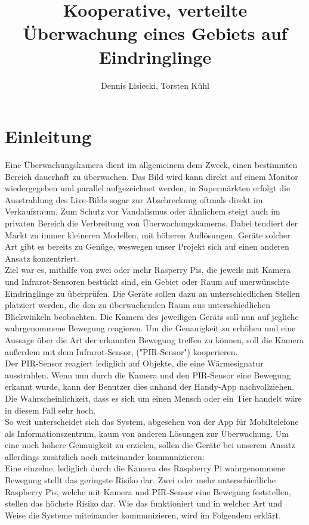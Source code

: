 \documentclass[journal]{IEEEtran}
\title{Kooperative, verteilte Überwachung eines Gebiets auf Eindringlinge}		%
\author{Dennis Lisiecki, Torsten Kühl}								%
\begin{document}

\maketitle	%




\section{Einleitung}
Eine Überwachungskamera dient im allgemeinem dem Zweck, einen bestimmten Bereich dauerhaft zu überwachen. Das Bild wird kann direkt auf einem Monitor wiedergegeben und parallel aufgezeichnet werden, in Supermärkten erfolgt die Ausstrahlung des Live-Bilds sogar zur Abschreckung oftmals direkt im Verkaufsraum. Zum Schutz vor Vandalismus oder ähnlichem steigt auch im privaten Bereich die Verbreitung von Überwachungskameras. Dabei tendiert der Markt zu immer kleineren Modellen, mit höheren Auflösungen. Geräte solcher Art gibt es bereits zu Genüge, weswegen unser Projekt sich auf einen anderen Ansatz konzentriert.\\ Ziel war es, mithilfe von zwei oder mehr Rasperry Pis, die jeweils mit Kamera und Infrarot-Sensoren bestückt sind, ein Gebiet oder Raum auf unerwünschte Eindringlinge zu überprüfen. Die Geräte sollen dazu an unterschiedlichen Stellen platziert werden, die den zu überwachenden Raum aus unterschiedlichen Blickwinkeln beobachten. Die Kamera des jeweiligen Geräts soll nun auf jegliche wahrgenommene Bewegung reagieren. Um die Genauigkeit zu erhöhen und eine Aussage über die Art der erkannten Bewegung treffen zu können, soll die Kamera außerdem mit dem Infrarot-Sensor, ("PIR-Sensor") kooperieren.\\ Der PIR-Sensor reagiert lediglich auf Objekte, die eine Wärmesignatur ausstrahlen. Wenn nun durch die Kamera und den PIR-Sensor eine Bewegung erkannt wurde, kann der Benutzer dies anhand der Handy-App nachvollziehen. Die Wahrscheinlichkeit, dass es sich um einen Mensch oder ein Tier handelt wäre in diesem Fall sehr hoch.\\ So weit unterscheidet sich das System, abgesehen von der App für Mobiltelefone als Informationszentrum, kaum von anderen Lösungen zur Überwachung. Um eine noch höhere Genauigkeit zu erzielen, sollen die Geräte bei unserem Ansatz allerdings zusätzlich noch miteinander kommunizieren:\\ Eine einzelne, lediglich durch die Kamera des Raspberry Pi wahrgenommene Bewegung stellt das geringste Risiko dar. Zwei oder mehr unterschiedliche Raspberry Pis, welche mit Kamera und PIR-Sensor eine Bewegung feststellen, stellen das höchste Risiko dar. Wie das funktioniert und in welcher Art und Weise die Systeme miteinander kommunizieren, wird im Folgendem erklärt.
\end{document}
